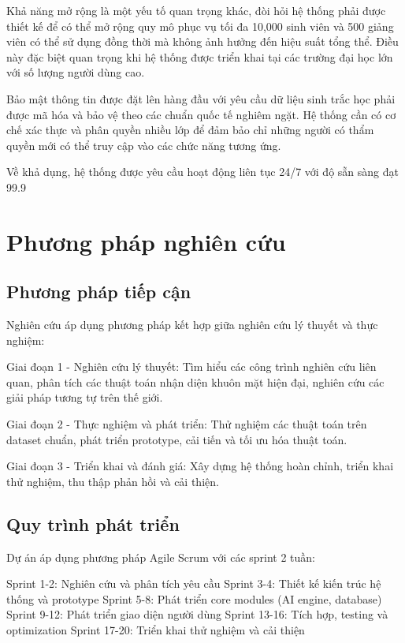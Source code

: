 \documentclass[12pt,a4paper]{report}
\begin{document}
Khả năng mở rộng là một yếu tố quan trọng khác, đòi hỏi hệ thống phải được thiết kế để có thể mở rộng quy mô phục vụ tối đa 10,000 sinh viên và 500 giảng viên có thể sử dụng đồng thời mà không ảnh hưởng đến hiệu suất tổng thể. Điều này đặc biệt quan trọng khi hệ thống được triển khai tại các trường đại học lớn với số lượng người dùng cao.

Bảo mật thông tin được đặt lên hàng đầu với yêu cầu dữ liệu sinh trắc học phải được mã hóa và bảo vệ theo các chuẩn quốc tế nghiêm ngặt. Hệ thống cần có cơ chế xác thực và phân quyền nhiều lớp để đảm bảo chỉ những người có thẩm quyền mới có thể truy cập vào các chức năng tương ứng.

Về khả dụng, hệ thống được yêu cầu hoạt động liên tục 24/7 với độ sẵn sàng đạt 99.9%

\section{Phương pháp nghiên cứu}
\subsection{Phương pháp tiếp cận}
Nghiên cứu áp dụng phương pháp kết hợp giữa nghiên cứu lý thuyết và thực nghiệm:

Giai đoạn 1 - Nghiên cứu lý thuyết: Tìm hiểu các công trình nghiên cứu liên quan, phân tích các thuật toán nhận diện khuôn mặt hiện đại, nghiên cứu các giải pháp tương tự trên thế giới.

Giai đoạn 2 - Thực nghiệm và phát triển: Thử nghiệm các thuật toán trên dataset chuẩn, phát triển prototype, cải tiến và tối ưu hóa thuật toán.

Giai đoạn 3 - Triển khai và đánh giá: Xây dựng hệ thống hoàn chỉnh, triển khai thử nghiệm, thu thập phản hồi và cải thiện.

\subsection{Quy trình phát triển}
Dự án áp dụng phương pháp Agile Scrum với các sprint 2 tuần:

Sprint 1-2: Nghiên cứu và phân tích yêu cầu
Sprint 3-4: Thiết kế kiến trúc hệ thống và prototype
Sprint 5-8: Phát triển core modules (AI engine, database)
Sprint 9-12: Phát triển giao diện người dùng
Sprint 13-16: Tích hợp, testing và optimization
Sprint 17-20: Triển khai thử nghiệm và cải thiện
\end{document}
